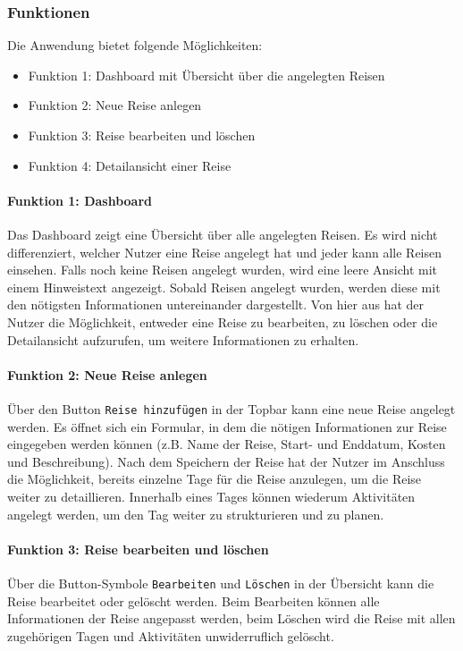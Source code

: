 \documentclass[12pt,a4paper]{article}
\begin{document}
        \subsubsection{Funktionen}
            Die Anwendung bietet folgende Möglichkeiten:
            \begin{itemize}[leftmargin=*]
                \item Funktion 1: Dashboard mit Übersicht über die angelegten Reisen
                \item Funktion 2: Neue Reise anlegen
                \item Funktion 3: Reise bearbeiten und löschen
                \item Funktion 4: Detailansicht einer Reise
            \end{itemize}

        \paragraph{Funktion 1: Dashboard}
            Das Dashboard zeigt eine Übersicht über alle angelegten Reisen.
            Es wird nicht differenziert, welcher Nutzer eine Reise angelegt hat und jeder kann alle Reisen einsehen.
            Falls noch keine Reisen angelegt wurden, wird eine leere Ansicht mit einem Hinweistext angezeigt.
            Sobald Reisen angelegt wurden, werden diese mit den nötigsten Informationen untereinander dargestellt.
            Von hier aus hat der Nutzer die Möglichkeit, entweder eine Reise zu bearbeiten, zu löschen oder die Detailansicht aufzurufen, um weitere Informationen zu erhalten.

        \paragraph{Funktion 2: Neue Reise anlegen}
            Über den Button \texttt{Reise hinzufügen} in der Topbar kann eine neue Reise angelegt werden.
            Es öffnet sich ein Formular, in dem die nötigen Informationen zur Reise eingegeben werden können (z.B. Name der Reise, Start- und Enddatum, Kosten und Beschreibung).
            Nach dem Speichern der Reise hat der Nutzer im Anschluss die Möglichkeit, bereits einzelne Tage für die Reise anzulegen, um die Reise weiter zu detaillieren.
            Innerhalb eines Tages können wiederum Aktivitäten angelegt werden, um den Tag weiter zu strukturieren und zu planen.

        \paragraph{Funktion 3: Reise bearbeiten und löschen}
            Über die Button-Symbole \texttt{Bearbeiten} und \texttt{Löschen} in der Übersicht kann die Reise bearbeitet oder gelöscht werden.
            Beim Bearbeiten können alle Informationen der Reise angepasst werden, beim Löschen wird die Reise mit allen zugehörigen Tagen und Aktivitäten unwiderruflich gelöscht.
\end{document}
